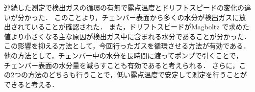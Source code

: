 \documentclass[../master]{subfiles}
\begin{document}
連続した測定で検出ガスの循環の有無で露点温度とドリフトスピードの変化の違いが分かった．
このことより，チェンバー表面から多くの水分が検出ガスに放出されていることが確認された．
また，ドリフトスピードがMagboltz で求めた値より小さくなる主な原因が検出ガス中に含まれる水分であることが分かった．
この影響を抑える方法として，今回行ったガスを循環させる方法が有効である．
他の方法として，チェンバー中の水分を長時間に渡ってポンプで引くことで，
チェンバー表面の水分量を減らすことも有効であると考えられる．
さらに，この2つの方法のどちらも行うことで，低い露点温度で安定して測定を行うことができると考える．
\end{document}
